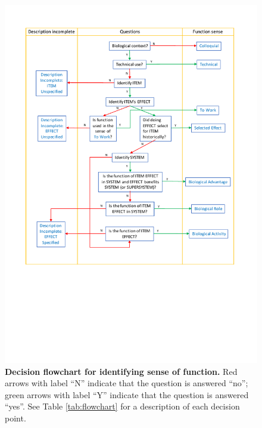 \documentclass{article}
\begin{document}
\begin{figure}[ht]
  \centering
  \includegraphics[width=0.7\linewidth]{figures/GeneralFlowchart.pdf}
  \caption[]{\textbf{Decision flowchart for identifying sense of function.} Red arrows with label ``N'' indicate that the question is answered ``no''; green arrows with label ``Y'' indicate that the question is answered ``yes''. See Table \ref{tab:flowchart} for a description of each decision point.}
  \label{flowchart}
\end{figure}
\end{document}
